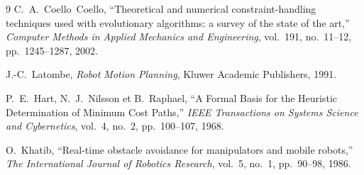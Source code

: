 \begin{thebibliography}{9}
C.~A.~Coello~Coello,
``Theoretical and numerical constraint-handling techniques used with
evolutionary algorithms: a survey of the state of the art,''
\emph{Computer Methods in Applied Mechanics and Engineering}, vol.~191,
no.~11--12, pp.~1245--1287, 2002.

J.-C.~Latombe,
\emph{Robot Motion Planning},
Kluwer Academic Publishers, 1991.

P.~E.~Hart, N.~J.~Nilsson et B.~Raphael,
``A Formal Basis for the Heuristic Determination of Minimum Cost Paths,''
\emph{IEEE Transactions on Systems Science and Cybernetics}, vol.~4, no.~2, pp.~100--107, 1968.

O.~Khatib,
``Real-time obstacle avoidance for manipulators and mobile robots,''
\emph{The International Journal of Robotics Research}, vol.~5, no.~1, pp.~90--98, 1986.

\end{thebibliography}
